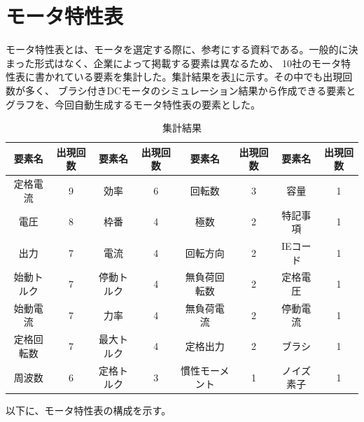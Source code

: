 \section{モータ特性表}\label{mortoku}
モータ特性表とは、モータを選定する際に、参考にする資料である\cite{仕様の見方}。一般的に決まった形式はなく、企業によって掲載する要素は異なるため、
10社のモータ特性表\cite{特性表1,特性表2,特性表3,特性表4,特性表5,特性表6,特性表7,特性表8,特性表9,特性表10}に書かれている要素を集計した。集計結果を表\ref{tab:syuukei}に示す。その中でも出現回数が多く、
ブラシ付きDCモータのシミュレーション結果から作成できる要素とグラフを、今回自動生成するモータ特性表の要素とした。
 \begin{table}[t]
	\centering
	\caption{集計結果}
	\begin{tabular}{|c|c||c|c||c|c||c|c|} \hline
	  要素名 & 出現回数 &  要素名 & 出現回数 &  要素名 & 出現回数 &  要素名 & 出現回数\\\hline\hline
	  定格電流 & 9 &  効率 & 6 & 回転数 & 3 & 容量 & 1 \\ \hline
	  電圧 & 8 &  枠番 & 4 & 極数 & 2 & 特記事項 & 1 \\ \hline
	  出力 & 7 &電流 & 4 &  回転方向 & 2 & IEコード & 1 \\ \hline
	  始動トルク & 7 & 停動トルク & 4 & 無負荷回転数 & 2 & 定格電圧 & 1 \\ \hline
	  始動電流 & 7 & 力率 & 4 &    無負荷電流 & 2 & 停動電流 & 1  \\ \hline
	  定格回転数 & 7 & 最大トルク & 4 &  定格出力 & 2 &ブラシ & 1  \\ \hline
	  周波数 & 6 & 定格トルク & 3 &  慣性モーメント & 1 & ノイズ素子 & 1 \\ \hline
	\end{tabular}
	 \label{tab:syuukei}
  \end{table}
以下に、モータ特性表の構成を示す。
